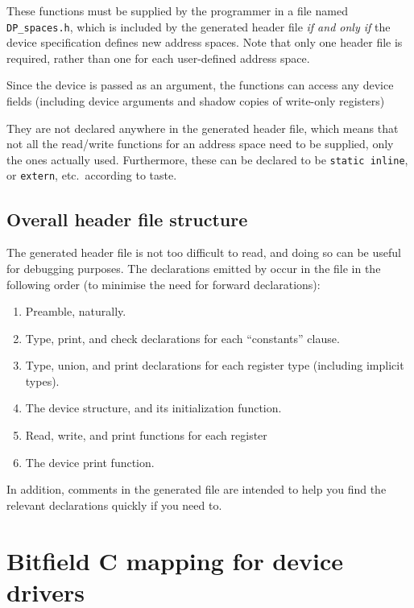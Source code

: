 \documentclass[a4paper,11pt,twoside]{report}
\begin{document}
These functions must be supplied by the programmer in a file named
\texttt{DP\_spaces.h}, which is included by the generated header file
\emph{if and only if} the device specification defines new address
spaces.  Note that only one header file is required, rather than one
for each user-defined address space.

Since the device is passed as an argument, the functions can access
any device fields (including device arguments and shadow copies of
write-only registers) 

They are not
declared anywhere in the generated header file, which means that not
all the read/write functions for an 
address space need to be supplied, only the ones actually used.
Furthermore, these can be declared to be \texttt{static inline}, or
\texttt{extern}, etc.\ according to taste.

\section{Overall header file structure}

The generated header file is not too difficult to read, and doing so
can be useful for debugging purposes.  The declarations emitted by
\Mac occur in the file in the following order (to minimise the need
for forward declarations):

\begin{enumerate}
\item Preamble, naturally.
\item Type, print, and check declarations for each ``constants''
  clause.
\item Type, union, and print declarations for each register type
  (including implicit types). 
\item The device structure, and its initialization function.
\item Read, write, and print functions for each register
\item The device print function. 
\end{enumerate}

In addition, comments in the generated file are intended to help you
find the relevant declarations quickly if you need to. 
 
\chapter{Bitfield C mapping for device drivers}\label{chap:bitfielddriver} 
\end{document}

